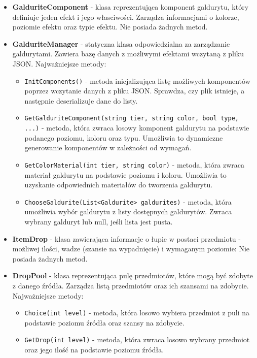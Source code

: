 \begin{itemize}
            \item \textbf{GalduriteComponent} - klasa reprezentująca komponent galdurytu, który definiuje jeden efekt i jego własciwości. 
            Zarządza informacjami o kolorze, poziomie efektu oraz typie efektu. Nie posiada żadnych metod.
            \item \textbf{GalduriteManager} - statyczna klasa odpowiedzialna za zarządzanie galdurytami. Zawiera bazę danych z możliwymi efektami wczytaną z pliku JSON.
            Najważniejsze metody:
                \begin{itemize}
                    \item \texttt{InitComponents()} - metoda inicjalizująca listę możliwych komponentów poprzez wczytanie danych z pliku JSON. 
                    Sprawdza, czy plik istnieje, a następnie deserializuje dane do listy.
                    \item \texttt{GetGalduriteComponent(string tier, string color, bool type, ...)} - metoda, która zwraca losowy komponent galdurytu na podstawie podanego poziomu, koloru oraz typu. 
                    Umożliwia to dynamiczne generowanie komponentów w zależności od wymagań.
                    \item \texttt{GetColorMaterial(int tier, string color)} - metoda, która zwraca materiał galdurytu na podstawie poziomu i koloru. 
                    Umożliwia to uzyskanie odpowiednich materiałów do tworzenia galdurytu.
                    \item \texttt{ChooseGaldurite(List<Galdurite> galdurites)} - metoda, która umożliwia wybór galdurytu z listy dostępnych galdurytów. 
                    Zwraca wybrany galduryt lub null, jeśli lista jest pusta.
                \end{itemize}
            \item \textbf{ItemDrop} - klasa zawierająca informacje o łupie w postaci przedmiotu - możliwej ilości, wadze (szansie na wypadnięcie) i wymaganym poziomie:
            Nie posiada żadnych metod.
            \item \textbf{DropPool} - klasa reprezentująca pulę przedmiotów, które mogą być zdobyte z danego źródła. 
            Zarządza listą przedmiotów oraz ich szansami na zdobycie. Najważniejsze metody:
                \begin{itemize}
                    \item \texttt{Choice(int level)} - metoda, która losowo wybiera przedmiot z puli na podstawie poziomu źródła oraz szansy na zdobycie.
                    \item \texttt{GetDrop(int level)} - metoda, która zwraca losowo wybrany przedmiot oraz jego ilość na podstawie poziomu źródła.

\end{itemize}
\end{itemize}
